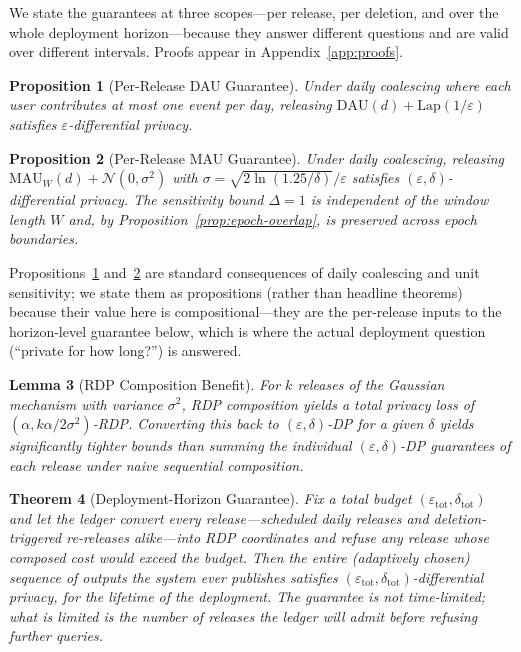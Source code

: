 \documentclass[sigconf,anonymous,review]{acmart}
\newtheorem{theorem}{Theorem}
\newtheorem{proposition}[theorem]{Proposition}
\newtheorem{lemma}[theorem]{Lemma}
\begin{document}
We state the guarantees at three scopes---per release, per deletion, and over the whole deployment horizon---because they answer different questions and are valid over different intervals. Proofs appear in Appendix~\ref{app:proofs}.

\begin{proposition}[Per-Release DAU Guarantee]
    \label{thm:dau-privacy}
    Under daily coalescing where each user contributes at most one event per day, releasing $\text{DAU}(d) + \text{Lap}(1/\varepsilon)$ satisfies $\varepsilon$-differential privacy.
\end{proposition}

\begin{proposition}[Per-Release MAU Guarantee]
    \label{thm:mau-privacy}
    Under daily coalescing, releasing $\text{MAU}_W(d) + \mathcal{N}(0, \sigma^2)$ with $\sigma = \sqrt{2\ln(1.25/\delta)}/\varepsilon$ satisfies $(\varepsilon, \delta)$-differential privacy. The sensitivity bound $\Delta = 1$ is independent of the window length $W$ and, by Proposition~\ref{prop:epoch-overlap}, is preserved across epoch boundaries.
\end{proposition}

Propositions~\ref{thm:dau-privacy} and~\ref{thm:mau-privacy} are standard consequences of daily coalescing and unit sensitivity; we state them as propositions (rather than headline theorems) because their value here is compositional---they are the per-release inputs to the horizon-level guarantee below, which is where the actual deployment question (``private for how long?'') is answered.

\begin{lemma}[RDP Composition Benefit]
    \label{lem:rdp}
    For $k$ releases of the Gaussian mechanism with variance $\sigma^2$, RDP composition yields a total privacy loss of $(\alpha, k\alpha/2\sigma^2)$-RDP. Converting this back to $(\varepsilon, \delta)$-DP for a given $\delta$ yields significantly tighter bounds than summing the individual $(\varepsilon, \delta)$-DP guarantees of each release under naive sequential composition.
\end{lemma}

\begin{theorem}[Deployment-Horizon Guarantee]
    \label{thm:horizon}
    Fix a total budget $(\varepsilon_{\mathrm{tot}}, \delta_{\mathrm{tot}})$ and let the ledger convert every release---scheduled daily releases and deletion-triggered re-releases alike---into RDP coordinates and refuse any release whose composed cost would exceed the budget. Then the entire (adaptively chosen) sequence of outputs the system ever publishes satisfies $(\varepsilon_{\mathrm{tot}}, \delta_{\mathrm{tot}})$-differential privacy, for the lifetime of the deployment. The guarantee is not time-limited; what is limited is the number of releases the ledger will admit before refusing further queries.
\end{theorem}
\end{document}
